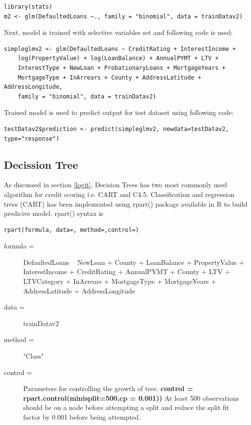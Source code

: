 \begin{verbatim}
library(stats)
m2 <- glm(DefaultedLoans ~., family = "binomial", data = trainDatav2)
\end{verbatim}

Next, model is trained with selective variables set and following code is used:

\begin{verbatim}
simpleglmv2 <- glm(DefaultedLoans ~ CreditRating + InterestIncome + 
    log(PropertyValue) + log(LoanBalance) + AnnualPYMT + LTV + 
    InterestType + NewLoan + ProbationaryLoans + MortgageYears + 
    MortgageType + InArrears + County + AddressLatitude + AddressLongitude, 
    family = "binomial", data = trainDatav2)
\end{verbatim}

Trained model is used to predict output for test dataset using following code:
\begin{verbatim}
testDatav2$prediction <- predict(simpleglmv2, newdata=testDatav2, type="response")
\end{verbatim}


\subsection{Decission Tree}

As discussed in section \ref{logit}, Decision Trees has two most commonly used algorithm for credit scoring i.e. CART and C4.5. Classification and regression trees (CART) has been implemented using rpart() package available in R to build predicive model. rpart() syntax is \begin{verbatim}
rpart(formula, data=, method=,control=)
\end{verbatim}

\begin{description}
  \item[formula =] DefaultedLoans ~ NewLoan + County + LoanBalance + PropertyValue + InterestIncome + CreditRating + AnnualPYMT + County + LTV + LTVCategory + InArrears + MortgageType + MortgageYears + AddressLatitude + AddressLongitude
  \item[data =]trainDatav2
  \item[method =] "Class"
  \item [control =] Parameters for controlling the growth of tree. 
  \textbf{control =  rpart.control(minisplit=500,cp = 0.001))} At least 500 observations should be on a node before attempting a split and reduce the split fit factor by 0.001 before being attempted.
\end{description}

